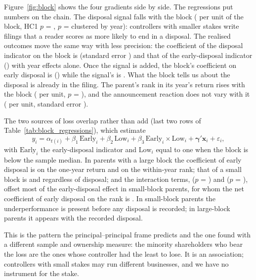 Figure~\ref{fig:block} shows the four gradients side by side. The regressions put numbers on the chain. The disposal signal falls with the block (\ScoreOnBlock{} per unit of the block, HC1 $p$ = \ScoreOnBlockP, $p$ = \ScoreOnBlockClP{} clustered by year): controllers with smaller stakes write filings that a reader scores as more likely to end in a disposal. The realised outcomes move the same way with less precision: the coefficient of the disposal indicator on the block is \BlockOnDisposed{} (standard error \BlockOnDisposedSE) and that of the early-disposal indicator \BlockOnEarlyAlone{} (\BlockOnEarlyAloneSE) with year effects alone. Once the signal is added, the block's coefficient on early disposal is \BlockOnEarlyWithScore{} (\BlockOnEarlyWithScoreSE) while the signal's is \ScoreOnEarlyWithBlock{}. What the block tells us about the disposal is already in the filing. The parent's rank in its year's return rises with the block (\RankOnBlock{} per unit, $p$ = \RankOnBlockP), and the announcement reaction does not vary with it (\BlockOnCar{} per unit, standard error \BlockOnCarSE).

The two sources of loss overlap rather than add (last two rows of Table~\ref{tab:block_regressions}), which estimate
\begin{equation}\label{eq:interaction}
y_i = \alpha_{t(i)} + \beta_1\,\mathrm{Early}_i + \beta_2\,\mathrm{Low}_i + \beta_3\,\mathrm{Early}_i\times\mathrm{Low}_i + \boldsymbol{\gamma}'\mathbf{x}_i + \varepsilon_i,
\end{equation}
with $\mathrm{Early}_i$ the early-disposal indicator and $\mathrm{Low}_i$ equal to one when the block is below the sample median. In parents with a large block the coefficient of early disposal is \EarlyCoefBhar{} on the one-year return and \EarlyCoefRank{} on the within-year rank; that of a small block is \LowBlockCoefBhar{} and \LowBlockCoefRank{} regardless of disposal; and the interaction terms, \InterCoefBhar{} ($p$ = \InterPBhar) and \InterCoefRank{} ($p$ = \InterPRank), offset most of the early-disposal effect in small-block parents, for whom the net coefficient of early disposal on the rank is \EarlyInLowBlockRank. In small-block parents the underperformance is present before any disposal is recorded; in large-block parents it appears with the recorded disposal.

This is the pattern the principal--principal frame predicts and the one  found with a different sample and ownership measure: the minority shareholders who bear the loss are the ones whose controller had the least to lose. It is an association; controllers with small stakes may run different businesses, and we have no instrument for the stake.

